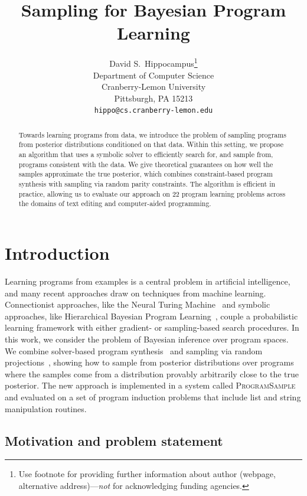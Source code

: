 \documentclass{article}
\title{Sampling for Bayesian Program Learning}
\author{
  David S.~Hippocampus\thanks{Use footnote for providing further
    information about author (webpage, alternative
    address)---\emph{not} for acknowledging funding agencies.} \\
  Department of Computer Science\\
  Cranberry-Lemon University\\
  Pittsburgh, PA 15213 \\
  \texttt{hippo@cs.cranberry-lemon.edu} \\
}
\newcommand{\theSystem}{\textsc{ProgramSample}}
\begin{document}

\maketitle

\begin{abstract}
Towards learning programs from data, we introduce the problem of sampling programs from posterior distributions conditioned on that data. Within this setting, we propose an algorithm that uses a symbolic solver to efficiently search for, and sample from, programs consistent with the data.
We give theoretical guarantees on how well the samples approximate the true posterior, which combines constraint-based program synthesis with sampling via random parity constraints.
The algorithm is efficient in practice, allowing us to evaluate our approach on 22 program learning problems across the domains of text editing and computer-aided programming.
\end{abstract}

\section{Introduction}
\label{introduction}
Learning programs from examples is a central problem in artificial intelligence, and many recent approaches draw on techniques from machine learning.
Connectionist approaches, like the Neural Turing Machine~\cite{graves2014neural,DBLP:journals/corr/ReedF15,vinyals2015pointer} and symbolic approaches, like Hierarchical Bayesian Program Learning~\cite{lake2015human,DBLP:conf/icml/LiangJK10,menon2013machine},
couple a probabilistic learning framework with either gradient- or sampling-based search procedures.
In this work,
we consider the problem of Bayesian inference over program spaces.
We combine solver-based program synthesis~\cite{solar2008program} and sampling via random projections~\cite{ermon2013embed},
showing how to sample from posterior distributions over programs where the samples come from a distribution provably arbitrarily close to the true posterior. The new approach is implemented in a system called \theSystem{}
and evaluated on a set of program induction problems that include list 
and string manipulation routines. 


\subsection{Motivation and problem statement}
\end{document}
